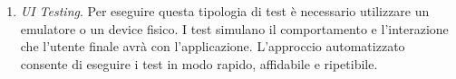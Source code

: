 \documentclass[12pt]{report}
\begin{document}
\begin{enumerate}
\item \textit{UI Testing}. Per eseguire questa tipologia di test è necessario utilizzare un emulatore o un device fisico. I test simulano il comportamento e l’interazione che l’utente finale avrà con l’applicazione. L'approccio automatizzato consente di eseguire i test in modo rapido, affidabile e ripetibile.%
\end{enumerate}

\end{document}
